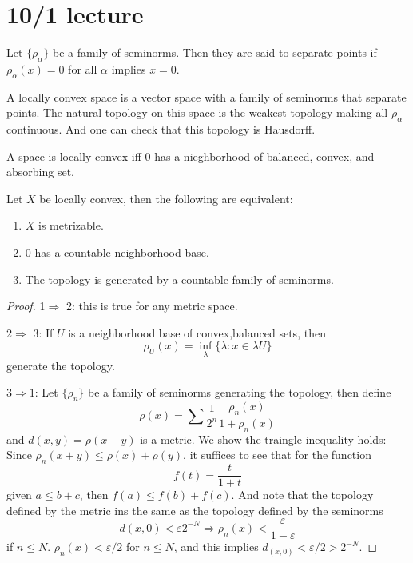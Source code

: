 \documentclass[openany]{book}
\begin{document}
\section{10/1 lecture}
\begin{defn}
    Let $\{\rho_\alpha\}$ be a family of seminorms. Then they are said to separate points if $\rho_\alpha(x)=0$ for all $\alpha$ implies $x=0$. 
\end{defn}

\begin{defn}
    A locally convex space is a vector space with a family of seminorms that separate points. The natural topology on this space is the weakest topology making all $\rho_\alpha$ continuous. And one can check that this topology is Hausdorff.
\end{defn}


\begin{prop}
    A space is locally convex iff $0$ has a nieghborhood of balanced, convex, and absorbing set.
\end{prop}

\begin{prop}
    Let $X$ be locally convex, then the following are equivalent:
    \begin{enumerate}
        \item $X$ is metrizable.
        \item $0$ has a countable neighborhood base.
        \item The topology is generated by a countable family of seminorms.
    \end{enumerate}
\end{prop}
\begin{proof}
    1$\Rightarrow$ 2: this is true for any metric space.

    2$\Rightarrow$ 3: If $U$ is a neighborhood base of convex,balanced sets, then 
    \begin{equation*}
        \rho_U(x)=\inf_\lambda\{\lambda: x\in\lambda U\}
    \end{equation*}
    generate the topology. 

    3$\Rightarrow 1$: Let $\{\rho_n\}$ be a family of seminorms generating the topology, then define 
    \begin{equation*}
        \rho(x)=\sum\frac{1}{2^n}\frac{\rho_n(x)}{1+\rho_n(x)}
    \end{equation*}
    and $d(x,y)=\rho(x-y)$ is a metric. We show the traingle inequality holds:
    Since $\rho_n(x+y)\leq\rho(x)+\rho(y)$, it suffices to see that for the function
    \begin{equation*}
        f(t)=\frac{t}{1+t}
    \end{equation*}
    given $a\leq b+c$, then $f(a)\leq f(b)+f(c)$. And note that the topology defined  by the metric ins the same as the topology defined by the seminorms 
    \begin{equation*}
        d(x,0)<\varepsilon 2^{-N}\Rightarrow \rho_n(x)<\frac{\varepsilon}{1-\varepsilon}
    \end{equation*}
    if $n\leq N$. $\rho_n(x)<\varepsilon/2$ for $n\leq N$, and this implies $d_(x,0)<\varepsilon/2>2^{-N}$.
\end{proof}
\end{document}

